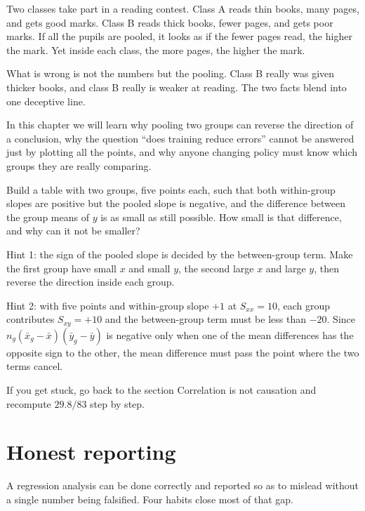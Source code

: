 \begin{untukanak}
Two classes take part in a reading contest. Class A reads thin books, many pages, and gets good
marks. Class B reads thick books, fewer pages, and gets poor marks. If all the pupils are pooled,
it looks as if the fewer pages read, the higher the mark. Yet inside each class, the more pages,
the higher the mark.

What is wrong is not the numbers but the pooling. Class B really was given thicker books, and
class B really is weaker at reading. The two facts blend into one deceptive line.

In this chapter we will learn why pooling two groups can reverse the direction of a conclusion,
why the question ``does training reduce errors'' cannot be answered just by plotting all the
points, and why anyone changing policy must know which groups they are really comparing.
\end{untukanak}

\begin{tantangan}
Build a table with two groups, five points each, such that both within-group slopes are positive
but the pooled slope is negative, and the difference between the group means of $y$ is as small
as still possible. How small is that difference, and why can it not be smaller?

Hint 1: the sign of the pooled slope is decided by the between-group term. Make the first group
have small $x$ and small $y$, the second large $x$ and large $y$, then reverse the direction
inside each group.

Hint 2: with five points and within-group slope $+1$ at $S_{xx}=10$, each group contributes
$S_{xy}=+10$ and the between-group term must be less than $-20$. Since
$n_g(\bar x_g-\bar x)(\bar y_g-\bar y)$ is negative only when one of the mean differences has
the opposite sign to the other, the mean difference must pass the point where the two terms
cancel.

If you get stuck, go back to the section Correlation is not causation and recompute
$29.8/83$ step by step.
\end{tantangan}

\section{Honest reporting}

A regression analysis can be done correctly and reported so as to mislead without a single number
being falsified. Four habits close most of that gap.

